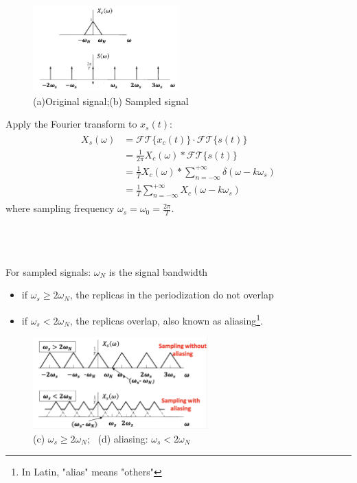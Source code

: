 \documentclass[12pt,a4paper]{article}
\begin{document}
\begin{minipage}{\textwidth}
\begin{figure}
\includegraphics[width = 0.5\textwidth]{images/sampling1}
\caption{(a)Original signal;(b) Sampled signal } \end{figure}
Apply the Fourier transform to  $x_{s}(t)$:
\begin{align*} \begin{split}
X_{s}(\omega) &= \mathcal{FT}\{x_{c}(t)\} \cdot \mathcal{FT}\{s(t)\}\\
&=\frac{1}{2\pi} X_{c}(\omega) * \mathcal{FT}\{s(t)\} \\
&=\frac{1}{T} X_{c}(\omega) * \sum_{n=-\infty}^{+\infty} \delta (\omega - k \omega_{s})\\
&=\boxed{\frac{1}{T} \sum_{n=-\infty}^{+\infty}  X_{c}(\omega - k \omega_{s})}
\end{split} \end{align*}
where sampling frequency $\omega_{s}=\omega_{0}=\frac{2\pi}{T}$.
\end{minipage}
\ \\\\\\
For sampled signals: $\omega_{N}$ is the signal bandwidth
\begin{itemize}
\item if $\omega_{s} \geq 2\omega_{N}$, the replicas in the periodization do not overlap
\item if $\omega_{s} < 2\omega_{N}$, the replicas overlap, also known as aliasing\footnote{In Latin, "alias" means "others"}.
\end{itemize} 

\begin{figure}[H]\centering
\includegraphics[width = 0.6\textwidth]{images/sampling2}
\caption{(c) $\omega_{s} \geq 2\omega_{N}$; \ (d) aliasing: $\omega_{s} < 2\omega_{N}$} \end{figure}
\end{document}
